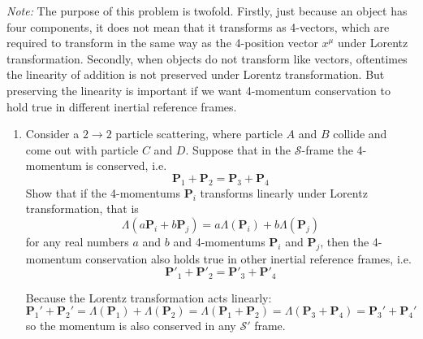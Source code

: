 \documentclass[10pt]{article}
\begin{document}
	\textit{Note:} The purpose of this problem is twofold. Firstly, just because an object has four
	components, it does not mean that it transforms as 4-vectors, which are required to transform in the same
	way as the 4-position vector \( x^{\mu} \) under Lorentz transformation. Secondly, when objects do not
	transform like vectors, oftentimes the linearity of addition is not preserved under Lorentz
	transformation. But preserving the linearity is important if we want 4-momentum conservation to hold true
	in different inertial reference frames. 
	\begin{enumerate}[label=(\alph*), resume]
		\item Consider a \( 2\to 2 \) particle scattering, where particle \( A \) and \( B \) collide and
			come out with particle \( C \) and \( D \). Suppose that in the \( \mathcal{S} \)-frame the
			4-momentum is conserved, i.e.
			\[
				\mathbf{P}_1 + \mathbf{P}_2 = \mathbf{P}_3 + \mathbf{P}_4
			\]
			Show that if the 4-momentums \( \mathbf{P}_i \) transforms linearly under Lorentz transformation,
			that is 
			\[
				\Lambda(a \mathbf{P}_i + b \mathbf{P}_j) = a\Lambda(\mathbf{P}_i) + b \Lambda(\mathbf{P}_j)
			\]
			for any real numbers \( a \) and \( b \) and 4-momentums \( \mathbf{P}_i \) and \( \mathbf{P}_j
			\), then the 4-momentum conservation also holds true in other inertial reference frames, i.e. 
			\[
				\mathbf{P}'_1 + \mathbf{P}'_2 = \mathbf{P}'_3 + \mathbf{P}'_4
			\]

			\begin{solution}
				Because the Lorentz transformation acts linearly:
				\[
					\mathbf{P}_1' + \mathbf{P}_2' = \Lambda(\mathbf{P}_1) + \Lambda(\mathbf{P}_2) =
					\Lambda(\mathbf{P}_1 + \mathbf{P}_2) = \Lambda(\mathbf{P}_3 + \mathbf{P}_4) =
					\mathbf{P}_3' + \mathbf{P}_4'
				\]
				so the momentum is also conserved in any \( \mathcal{S}' \) frame. 
			\end{solution}
	\end{enumerate}
	\pagebreak
\end{document}
